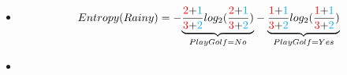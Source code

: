 \documentclass[xcolor=table]{beamer}
\begin{document}
\begin{frame}
\begin{itemize} \itemsep1pt \parskip0pt 
  \item[] {\scriptsize \begin{equation*}Entropy(Rainy) = -\underset{Play Golf = No}{\underbrace{\frac{\color{red}{2}\color{black}{+}\color{cyan}{1}}{\color{red}{3}\color{black}{+}\color{cyan}{2}}log_2{(\frac{\color{red}{2}\color{black}{+}\color{cyan}{1}}{\color{red}{3}\color{black}{+}\color{cyan}{2}}})}} - \underset{PlayGolf = Yes}{\underbrace{\frac{\color{red}{1}\color{black}{+}\color{cyan}{1}}{\color{red}{3}\color{black}{+}\color{cyan}{2}}log_2{(\frac{\color{red}{1}\color{black}{+}\color{cyan}{1}}{\color{red}{3}\color{black}{+}\color{cyan}{2}}})}}\end{equation*}}
  \item[] 
\end{itemize}

\end{frame}
\end{document}

